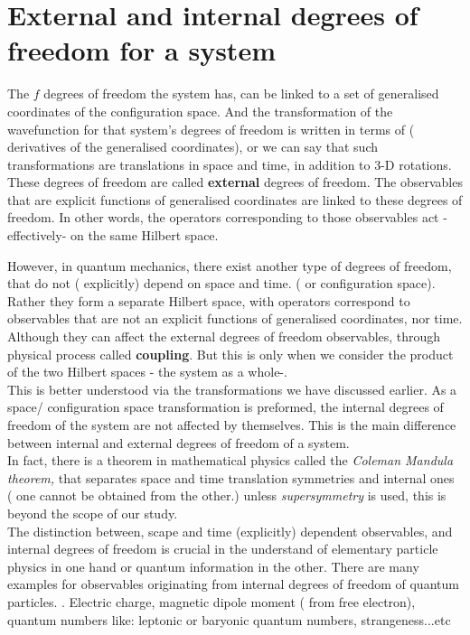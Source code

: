 \section{ External and internal degrees of freedom for a system}
The $ f$ degrees of freedom the system has, can be linked to a set of generalised coordinates of the configuration space. And the transformation of the wavefunction for that system's degrees of freedom is written in terms of ( derivatives of the generalised coordinates), or we can say that such transformations are translations in space and time, in addition to 3-D rotations.\\
These degrees of freedom are called \textbf{external} degrees of freedom.  The observables that are explicit functions of generalised coordinates are linked to these degrees of freedom. In other words, the operators corresponding to those observables act - effectively- on the same Hilbert space. \\ 
\par 
However, in quantum mechanics, there exist another type of degrees of freedom, that do not ( explicitly) depend on space and time. ( or configuration space). Rather they form a separate Hilbert space, with operators correspond to observables that are not an explicit functions of generalised coordinates, nor time.   Although they can affect the external degrees of freedom observables, through physical process called  \textbf{coupling}. But this is only when we consider the product of the two Hilbert spaces - the system as a whole-. \\ This is better understood via the transformations we have discussed earlier. As a space/ configuration space transformation is preformed, the internal degrees of freedom of the system are not affected by themselves. This is the main difference between internal and external degrees of freedom of a system. \\
In fact, there is a theorem in mathematical physics called the \textit{Coleman Mandula theorem,} that separates space and time translation symmetries and internal ones ( one cannot be obtained from the other.) unless \textit{supersymmetry} is used, this is beyond the scope of our study. \\
The distinction between, scape and time (explicitly) dependent observables, and internal degrees of freedom is crucial in the understand of elementary particle physics in one hand or quantum information in the other. There are many examples for observables originating from internal degrees of freedom of quantum particles. . Electric charge, magnetic dipole moment ( from free electron), quantum numbers like: leptonic or baryonic quantum numbers, strangeness...etc  

